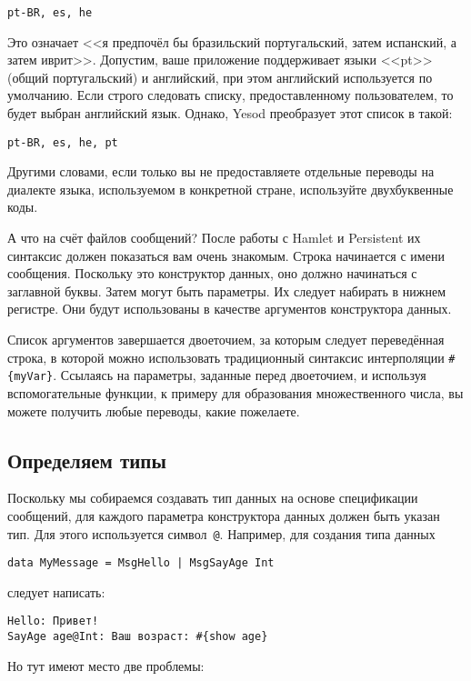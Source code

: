 \begin{lstlisting}
pt-BR, es, he
\end{lstlisting}

Это означает <<я предпочёл бы бразильский португальский, затем испанский, а
затем иврит>>. Допустим, ваше приложение поддерживает языки <<pt>> (общий
португальский) и английский, при этом английский используется по умолчанию.
Если строго следовать списку, предоставленному пользователем, то будет выбран
английский язык. Однако, Yesod преобразует этот список в такой:

\begin{lstlisting}
pt-BR, es, he, pt
\end{lstlisting}

Другими словами, если только вы не предоставляете отдельные переводы на
диалекте языка, используемом в конкретной стране, используйте двухбуквенные
коды.

А что на счёт файлов сообщений? После работы с Hamlet и Persistent их синтаксис
должен показаться вам очень знакомым. Строка начинается с имени сообщения.
Поскольку это конструктор данных, оно должно начинаться с заглавной буквы.
Затем могут быть параметры. Их следует набирать в нижнем регистре. Они будут
использованы в качестве аргументов конструктора данных.

Список аргументов завершается двоеточием, за которым следует переведённая
строка, в которой можно использовать традиционный синтаксис интерполяции
\lstinline'#{myVar}'. Ссылаясь на параметры, заданные перед двоеточием, и
используя вспомогательные функции, к примеру для образования множественного
числа, вы можете получить любые переводы, какие пожелаете.

\subsection{Определяем типы}

Поскольку мы собираемся создавать тип данных на основе спецификации сообщений,
для каждого параметра конструктора данных должен быть указан тип. Для этого
используется символ~\lstinline'@'. Например, для создания типа данных
\begin{lstlisting}
data MyMessage = MsgHello | MsgSayAge Int
\end{lstlisting}
следует написать:
\begin{lstlisting}
Hello: Привет!
SayAge age@Int: Ваш возраст: #{show age}
\end{lstlisting}

Но тут имеют место две проблемы:

